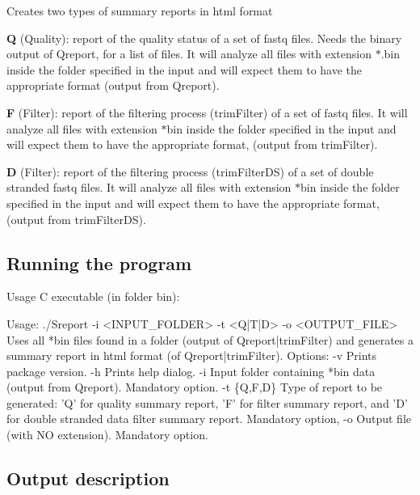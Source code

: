 Creates two types of summary reports in html format


\begin{DoxyItemize}
\item {\bfseries Q} (Quality)\+: report of the quality status of a set of {\ttfamily fastq} files. Needs the binary output of {\ttfamily Qreport}, for a list of files. It will analyze all files with extension {\ttfamily $\ast$.bin} inside the folder specified in the input and will expect them to have the appropriate format (output from {\ttfamily Qreport}).
\item {\bfseries F} (Filter)\+: report of the filtering process ({\ttfamily trim\+Filter}) of a set of {\ttfamily fastq} files. It will analyze all files with extension {\ttfamily $\ast$bin} inside the folder specified in the input and will expect them to have the appropriate format, (output from {\ttfamily trim\+Filter}).
\item {\bfseries D} (Filter)\+: report of the filtering process ({\ttfamily trim\+Filter\+DS}) of a set of double stranded {\ttfamily fastq} files. It will analyze all files with extension {\ttfamily $\ast$bin} inside the folder specified in the input and will expect them to have the appropriate format, (output from {\ttfamily trim\+Filter\+DS}).
\end{DoxyItemize}

\subsection*{Running the program}

Usage {\ttfamily C} executable (in folder {\ttfamily bin})\+:


\begin{DoxyCode}
Usage: ./Sreport -i <INPUT\_FOLDER> -t <Q|T|D> -o <OUTPUT\_FILE>
Uses all *bin files found in a folder (output of Qreport|trimFilter)
and generates a summary report in html format (of Qreport|trimFilter).
Options:
 -v Prints package version.
 -h Prints help dialog.
 -i Input folder containing *bin data (output from Qreport). Mandatory option.
 -t \{Q,F,D\} Type of report to be generated: 'Q' for quality summary
    report, 'F' for filter summary report, and 'D' for double stranded
    data filter summary report. Mandatory option,
 -o Output file (with NO extension). Mandatory option.
\end{DoxyCode}


\subsection*{Output description}


